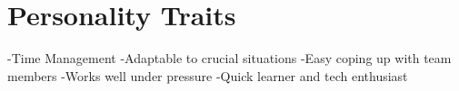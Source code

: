 \documentclass[letterpaper]{twentysecondcv} %
\begin{document}
\section{Personality Traits}

-Time Management
\newline-Adaptable to crucial situations
\newline-Easy coping up with team members
\newline-Works well under pressure
\newline-Quick learner and tech enthusiast



%
%
%
%



%
%

%



\end{document}
